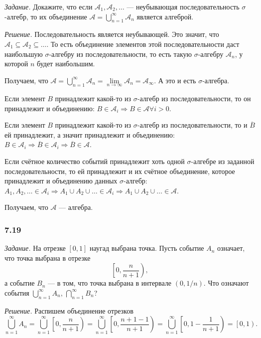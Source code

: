 \textit{Задание.}
Докажите, что если $ \mathcal{A}_1, \mathcal{A}_2, \dotsc $ ---
неубывающая последовательность $ \sigma $-алгебр, то их объединение $ \mathcal{A} = \bigcup \limits_{n=1}^{ \infty } \mathcal{A}_n$ является алгеброй.

\textit{Решение.} Последовательность является неубывающей.
Это значит, что $ \mathcal{A}_1 \subseteq \mathcal{A}_2 \subseteq \dotsc $.
То есть объединение элементов этой последовательности даст наибольшую $ \sigma $-алгебру из последовательности, то есть такую $ \sigma $-алгебру $ \mathcal{A}_n$, у которой $n$ будет наибольшим.

Получаем,
что
$ \mathcal{A} =
\bigcup \limits_{n=1}^{ \infty } \mathcal{A}_n =
\lim \limits_{n \rightarrow \infty } \mathcal{A}_n =
\mathcal{A}_{ \infty}$.
А это и есть $ \sigma $-алгебра.

Если элемент $B$ принадлежит какой-то из $ \sigma $-алгебр из последовательности,
то он принадлежит и объединению: $B \in \mathcal{A}_i \Rightarrow B \in \mathcal{A} \forall i > 0$.

Если элемент $B$ принадлежит какой-то из $ \sigma $-алгебр из последовательности,
то и $ \overline{B} $ ей принадлежит, а значит принадлежит и объединению:
$B \in \mathcal{A}_i \Rightarrow
\overline{B} \in \mathcal{A}_i \Rightarrow
\overline{B} \in \mathcal{A} $.

Если счётное количество событий принадлежит хоть одной $ \sigma $-алгебре из заданной последовательности,
то ей принадлежит и их счётное объединение, которое принадлежит и объединению данных $ \sigma $-алгебр:
$A_1, A_2, \dotsc \in \mathcal{A}_i \Rightarrow
A_1 \cup A_2 \cup \dotsc \in \mathcal{A}_i \Rightarrow
A_1 \cup A_2 \cup \dotsc \in \mathcal{A} $.

Получаем, что $ \mathcal{A} $ --- алгебра.

\subsubsection*{7.19}

\textit{Задание.} На отрезке $ \left[ 0, 1 \right] $ наугад выбрана точка.
Пусть событие $A_n$ означает, что точка выбрана в отрезке
$$ \left[ 0, \frac{n}{n+1} \right),$$
а событие $B_n$ --- в том, что точка выбрана в интервале $ \left( 0, 1/n \right) $.
Что означают события $ \bigcup \limits_{n=1}^{ \infty } A_n, \, \bigcap \limits_{n=1}^{ \infty } B_n$?

\textit{Решение.} Распишем объединение отрезков
$$ \bigcup \limits_{n=1}^{ \infty } A_n =
\bigcup \limits_{n=1}^{ \infty } \left[ 0, \frac{n}{n+1} \right) =
\bigcup \limits_{n=1}^{ \infty } \left[ 0, \frac{n+1-1}{n+1} \right) =
\bigcup \limits_{n=1}^{ \infty } \left[ 0, 1 - \frac{1}{n+1} \right) =
\left[ 0, 1 \right).$$
